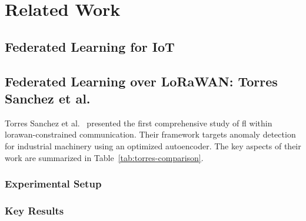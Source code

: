\chapter{Related Work}
\label{ch:related-work}

\section{Federated Learning for IoT}
\label{sec:fl-iot}


\section{Federated Learning over LoRaWAN: Torres Sanchez et al.}
\label{sec:torres-sanchez}


Torres Sanchez et al.~\cite{torressanchez2024federated} presented the first comprehensive
study of \gls{fl} within \gls{lorawan}-constrained communication. Their framework
targets anomaly detection for industrial machinery using an optimized autoencoder. The key
aspects of their work are summarized in Table~\ref{tab:torres-comparison}.

\subsection{Experimental Setup}

\subsection{Key Results}

